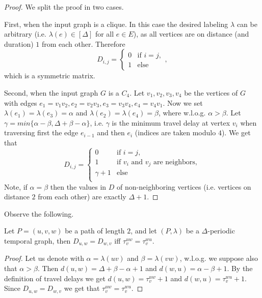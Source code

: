 \documentclass[a4paper,UKenglish,cleveref, autoref, thm-restate]{lipics-v2021}
\begin{document}
\begin{proof}
	We split the proof in two cases.
	
	First, when the input graph is a clique. In this case the desired labeling $\lambda$ can be arbitrary (i.e. $\lambda(e) \in [\Delta]$ for all $e \in E$), 
	as all vertices are on distance (and duration) $1$ from each other.
	Therefore 
	\begin{equation*}
		D_{i,j} =
		\begin{cases}
			0 & \text{if $i = j$}, \\
			1 & \text{else}
		\end{cases},
	\end{equation*}
	which is a symmetric matrix.
	
	Second, when the input graph $G$ is a $C_4$. Let $v_1, v_2, v_3, v_4$ be the vertices of $G$ with edges $e_1 = v_1 v_2, e_2 = v_2 v_3, e_3 = v_3 v_4, e_4 = v_4 v_1$.
	Now we set $\lambda(e_1) = \lambda (e_3) = \alpha$ and $\lambda(e_2) = \lambda(e_4) = \beta$, where w.l.o.g. $\alpha > \beta$.
	Let $\gamma = min \{ \alpha - \beta, \Delta + \beta - \alpha\}$,
	i.e. $\gamma$ is the minimum travel delay at vertex $v_i$ when traversing first the edge $e_{i-1}$ and then $e_i$ (indices are taken modulo $4$).
	We get that 
	\begin{equation*}
		D_{i,j} =
		\begin{cases}
			0 & \text{if $i = j$}, \\
			1 & \text{if $v_i$ and $v_j$ are neighbors},\\
			\gamma + 1 & \text{else}\\
		\end{cases}
	\end{equation*}
	Note, if $\alpha = \beta$ then the values in $D$ of non-neighboring vertices (i.e. vertices on distance $2$ from each other)
	are exactly $\Delta + 1$.
\end{proof}


Observe the following.
\begin{claim}
	Let $P = (u, v, w)$ be a path of length $2$, and let $(P,\lambda)$ be a $\Delta$-periodic temporal graph,
	 then $D_{u,w} = D_{w,v}$ iff $\tau_v^{uw} = \tau_v^{wu}$. 
\end{claim}
\begin{proof}
	Let us denote with $\alpha = \lambda(uv)$ and  $\beta = \lambda(vw)$,
	w.l.o.g. we suppose also that $\alpha > \beta$.
	Then $d(u,w) = \Delta + \beta - \alpha + 1$ 
	and $d(w,u) = \alpha - \beta + 1$.
	By the definition of travel delays we get $d(u,w) = \tau_v^{uw} + 1$ and $d(w,u) = \tau_v^{wu} + 1$. 
	Since $D_{u,w} = D_{w,v}$ we get that $\tau_v^{uw} = \tau_v^{wu}$.
\end{proof}
\end{document}
